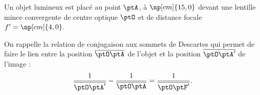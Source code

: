 
\finEntrainement




\newpage








\hauteurLargeurCadreReponse		{8mm}{5cm}
\initialisationEntrainement

Un objet lumineux est placé au point $\ptA$, à $\np[cm]{15,0}$ devant une lentille mince convergente de centre optique $\ptO$ et de distance focale $f'=\np[cm]{4,0}$.

On rappelle la relation de conjugaison aux sommets de Descartes qui permet de faire le lien entre la position $\overline{\ptO\ptA}$ de l'objet et la position $\overline{\ptO\ptA'}$ de l'image :
\[
\frac{1}{\overline{\ptO\ptA'}}-\frac{1}{\overline{\ptO\ptA}}=\frac{1}{\overline{\ptO\ptF'}}.
\]

\minusMedskip

\debutEntrainement



